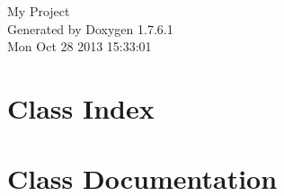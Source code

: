 \documentclass[a4paper]{book}
\begin{document}
\hypersetup{pageanchor=false,citecolor=blue}
\begin{titlepage}
\vspace*{7cm}
\begin{center}
{\Large \-My \-Project }\\
\vspace*{1cm}
{\large \-Generated by Doxygen 1.7.6.1}\\
\vspace*{0.5cm}
{\small Mon Oct 28 2013 15:33:01}\\
\end{center}
\end{titlepage}
\clearemptydoublepage
{}
\tableofcontents
\clearemptydoublepage
{}
\hypersetup{pageanchor=true,citecolor=blue}
\chapter{\-Class \-Index}

\chapter{\-Class \-Documentation}























\printindex
\end{document}
